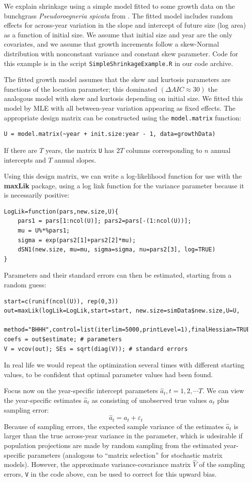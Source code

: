 \documentclass[12pt]{article}
\newcommand{\be}{\begin{equation}}
\newcommand{\ee}{\end{equation}}
\begin{document}
We explain shrinkage using a simple model fitted to some growth data 
on the bunchgrass \emph{Pseudoroegneria spicata} from \cite{adler-weak-dryad}. 
The fitted model includes random effects for across-year variation in the slope and 
intercept of future size (log area) as a function of initial size. We assume that initial size 
and year are the only covariates, and we assume that growth increments 
follow a skew-Normal distribution with nonconstant variance and constant skew parameter. 
Code for this example is in the script \texttt{SimpleShrinkageExample.R} in our code archive. 

The fitted growth model assumes that the skew and kurtosis parameters are functions
of the location parameter; this dominated $(\Delta AIC \approx 30)$ the analogous  
model with skew and kurtosis depending on initial size.   
We fitted this model by MLE with all between-year variation appearing as fixed effects. 
The appropriate design matrix can be constructed using the \texttt{model.matrix} function: 
\begin{lstlisting}
U = model.matrix(~year + init.size:year - 1, data=growthData)
\end{lstlisting}
If there are $T$ years, the matrix \texttt{U} has $2T$ columns corresponding to $n$ annual 
intercepts and $T$ annual slopes. 

Using this design matrix, we can write a log-likelihood function for use with 
the \textbf{maxLik} package, using a log link function for the variance parameter 
because it is necessarily positive: 
\begin{lstlisting}
LogLik=function(pars,new.size,U){
    pars1 = pars[1:ncol(U)]; pars2=pars[-(1:ncol(U))];
    mu = U%*%pars1;  
    sigma = exp(pars2[1]+pars2[2]*mu);
    dSN1(new.size, mu=mu, sigma=sigma, nu=pars2[3], log=TRUE)
}
\end{lstlisting} 
Parameters and their standard errors can then be estimated, starting from a random guess: 
\begin{lstlisting}
start=c(runif(ncol(U)), rep(0,3))
out=maxLik(logLik=LogLik,start=start, new.size=simData$new.size,U=U,
  method="BHHH",control=list(iterlim=5000,printLevel=1),finalHessian=TRUE);
coefs = out$estimate; # parameters
V = vcov(out); SEs = sqrt(diag(V));	# standard errors 
\end{lstlisting}  
In real life we would repeat the optimization several times with different starting values, 
to be confident that optimal parameter values had been found. 

Focus now on the year-specific intercept parameters $\hat{a}_t, t = 1,2,\cdots T$. 
We can view the year-specific estimates $\hat{a}_t$ as consisting of unobserved true values $a_t$ plus sampling error:
\be
\hat{a}_t= a_t + \varepsilon_t 
\ee
Because of sampling errors, the expected sample variance of the estimates $\hat{a}_t$ is larger 
than the true across-year variance in the parameter, which is udesirable if population projections are made
by random sampling from the estimated year-specific parameters (analogous to ``matrix selection'' for stochastic
matrix models). However, the approximate variance-covariance matrix $\hat{V}$ of the sampling errors, \texttt{V} in the code 
above, can be used to correct for this upward bias.   
\end{document}
